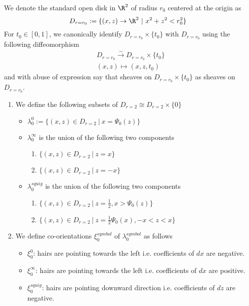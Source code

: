 \begin{definition}
We denote the standard open disk in $\R^2$ of radius $r_0$ centered at the origin as 
\[
D_{r=r_0} := \{(x,z)\rightarrow \R^2 ~|~ x^2+z^2 < r_0^2\}
\]
For $t_0 \in [0,1]$, we canonically identify $D_{r=r_0}\times \{t_0\}$ with $D_{r=r_0}$ using the following diffeomorphism
\begin{align*}
& D_{r=r_0} \xrightarrow{\sim} D_{r=r_0} \times \{t_0\} \\
& (x,z) \mapsto (x,z,t_0)
\end{align*}
and with abuse of expression say that sheaves on $D_{r=r_0}\times \{t_0\}$ as sheaves on $D_{r=r_0}$.
\end{definition}

\begin{definition}
\begin{enumerate}
\item We define the following subsets of $D_{r=2} \cong D_{r=2}\times \{0\}$
\begin{itemize}
\item $\lambda_0^0 := \{(x,z) \in D_{r=2} ~|~ x = \Psi_0(z)\}$

\item $\lambda_0^\infty$ is the union of the following two components
\begin{enumerate}[label=(\roman*)]
\item $\{(x,z) \in D_{r=2} ~|~ z = x \}$

\item $\{(x,z) \in D_{r=2} ~|~ z = -x \}$
\end{enumerate}

\item $\lambda_0^{squig}$ is the union of the following two components
\begin{enumerate}[label=(\roman*)]
\item $\{(x,z) \in D_{r=2} ~|~ z = \frac{1}{2}, x > \Psi_0(z) \}$

\item $\{(x,z) \in D_{r=2} ~|~ z = \frac{1}{2}\Psi_0(x), -x < z < x \}$
\end{enumerate}
\end{itemize}

\item We define co-orientations $\xi_0^{symbol}$ of $\lambda_0^{symbol}$ as follows
\begin{itemize}
\item $\xi_0^0$: hairs are pointing towards the left i.e. coefficients of $dx$ are negative.

\item $\xi_0^\infty$: hairs are pointing towards the left i.e. coefficients of $dx$ are positive.

\item $\xi_0^{squig}$: hairs are pointing downward direction i.e. coefficients of $dz$ are negative.
\end{itemize}
\end{enumerate}
\end{definition}

